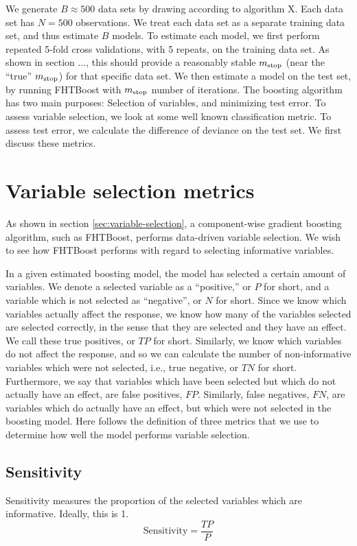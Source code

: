 We generate $B\approx500$ data sets by drawing according to algorithm X. Each data set has $N=500$ observations. 
We treat each data set as a separate training data set, and thus estimate $B$ models.
To estimate each model, we first perform repeated 5-fold cross validations, with 5 repeats, on the training data set.
As shown in section ..., this should provide a reasonably stable $m_{\text{stop}}$ (near the ``true'' $m_{\text{stop}}$) for that specific data set.
We then estimate a model on the test set, by running FHTBoost with $m_{\text{stop}}$ number of iterations.
The boosting algorithm has two main purposes: Selection of variables, and minimizing test error.
To assess variable selection, we look at some well known classification metric.
To assess test error, we calculate the difference of deviance on the test set.
We first discuss these metrics.

\section{Variable selection metrics}
As shown in section \ref{sec:variable-selection}, a component-wise gradient boosting algorithm, such as FHTBoost,
performs data-driven variable selection.
We wish to see how FHTBoost performs with regard to selecting informative variables.

In a given estimated boosting model, the model has selected a certain amount of variables.
We denote a selected variable as a ``positive,'' or $P$ for short, and a variable which is not selected as ``negative'', or $N$ for short.
Since we know which variables actually affect the response, we know how many of the variables selected are selected correctly, in the sense
that they are selected and they have an effect. We call these true positives, or $TP$ for short.
Similarly, we know which variables do not affect the response, and so we can calculate the number of non-informative variables
which were not selected, i.e., true negative, or $TN$ for short.
Furthermore, we say that variables which have been selected but which do not actually have an effect, are false positives, $FP$.
Similarly, false negatives, $FN$, are variables which do actually have an effect, but which were not selected in the boosting model.
Here follows the definition of three metrics that we use to determine how well the model performs variable selection.

\subsection{Sensitivity}
Sensitivity measures the proportion of the selected variables which are informative.
Ideally, this is 1.
\begin{equation}\label{eq:sensitivity}
    \text{Sensitivity}=\frac{TP}{P}
\end{equation}


